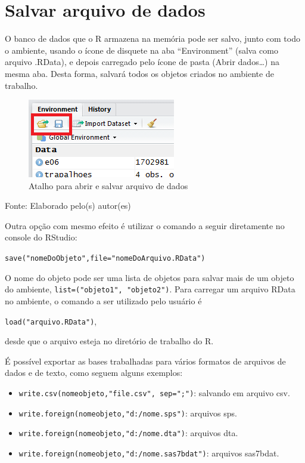 \documentclass[12pt,portuguese,oneside]{book}
\providecommand{\tightlist}{%
  \setlength{\itemsep}{0pt}\setlength{\parskip}{0pt}}
\begin{document}
\section{Salvar arquivo de dados}\label{salvar-arquivo-de-dados}

O banco de dados que o R armazena na memória pode ser salvo, junto com
todo o ambiente, usando o ícone de disquete na aba ``Environment''
(salva como arquivo .RData), e depois carregado pelo ícone de pasta
(Abrir dados\ldots{}) na mesma aba. Desta forma, salvará todos os
objetos criados no ambiente de trabalho.

\begin{figure}[H]

{\centering \includegraphics[width=0.8\linewidth]{r6} 

}

\caption{Atalho para abrir e salvar arquivo de dados}\label{fig:r6}
\end{figure}

Fonte: Elaborado pelo(s) autor(es)

Outra opção com mesmo efeito é utilizar o comando a seguir diretamente
no console do RStudio:

\texttt{save("nomeDoObjeto",file="nomeDoArquivo.RData")}

O nome do objeto pode ser uma lista de objetos para salvar mais de um
objeto do ambiente, \texttt{list=("objeto1",\ "objeto2")}. Para carregar
um arquivo RData no ambiente, o comando a ser utilizado pelo usuário é

\texttt{load("arquivo.RData")},

desde que o arquivo esteja no diretório de trabalho do R.

É possível exportar as bases trabalhadas para vários formatos de
arquivos de dados e de texto, como seguem alguns exemplos:

\begin{itemize}
\tightlist
\item
  \texttt{write.csv(nomeobjeto,"file.csv",\ sep=";")}: salvando em
  arquivo csv.
\item
  \texttt{write.foreign(nomeobjeto,"d:/nome.sps")}: arquivos sps.
\item
  \texttt{write.foreign(nomeobjeto,"d:/nome.dta")}: arquivos dta.
\item
  \texttt{write.foreign(nomeobjeto,"d:/nome.sas7bdat")}: arquivos
  sas7bdat.
\end{itemize}
\end{document}
